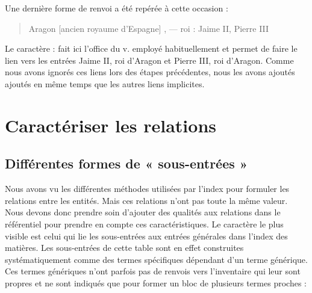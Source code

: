 \documentclass[a4paper,12pt,twoside]{book}
\begin{document}
	Une dernière forme de renvoi a été repérée à cette occasion :
	
	\begin{quotation}
		Aragon [ancien royaume d'Espagne] , — roi : Jaime II, Pierre III
	\end{quotation}
	
	\noindent Le caractère \og :\fg{} fait ici l'office du \og v.\fg{} employé habituellement et permet de faire le lien vers les entrées \og Jaime II, roi d'Aragon\fg{} et \og Pierre III, roi d'Aragon\fg{}. Comme nous avons ignorés ces liens lors des étapes précédentes, nous les avons ajoutés ajoutés en même temps que les autres liens implicites.
	
	\section{Caractériser les relations}
	
	\subsection{Différentes formes de « sous-entrées »}
	
	Nous avons vu les différentes méthodes utilisées par l'index pour formuler les relations entre les entités. Mais ces relations n'ont pas toute la même valeur. Nous devons donc prendre soin d'ajouter des qualités aux relations dans le référentiel pour prendre en compte ces caractéristiques. Le caractère le plus visible est celui qui lie les sous-entrées aux entrées générales dans l'index des matières. Les sous-entrées de cette table sont en effet construites systématiquement comme des termes spécifiques dépendant d'un terme générique. Ces termes génériques n'ont parfois pas de renvois vers l'inventaire qui leur sont propres et ne sont indiqués que pour former un bloc de plusieurs termes proches :
	
	\pagebreak
	
\end{document}
